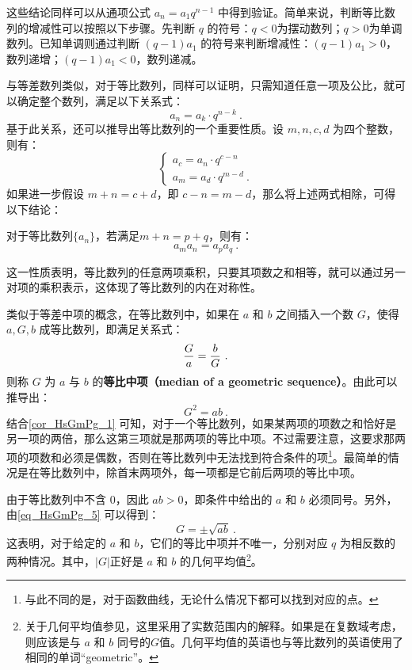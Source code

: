 这些结论同样可以从通项公式 $a_n = a_1 q^{n-1}$ 中得到验证。简单来说，判断等比数列的增减性可以按照以下步骤。先判断 $q$ 的符号：$q<0$为摆动数列；$q>0$为单调数列。已知单调则通过判断 $(q - 1)a_1$ 的符号来判断增减性：$(q - 1)a_1 > 0$，数列递增；$(q - 1)a_1 < 0$，数列递减。

与等差数列类似，对于等比数列，同样可以证明，只需知道任意一项及公比，就可以确定整个数列，满足以下关系式：
\begin{equation}
a_n=a_k\cdot q^{n-k}~.
\end{equation}
基于此关系，还可以推导出等比数列的一个重要性质。设 $m, n, c, d$ 为四个整数，则有：
\begin{equation}
\begin{cases}
a_c=a_n\cdot q^{c-n}\\
a_m=a_d\cdot q^{m-d}~.
\end{cases}
\end{equation}
如果进一步假设 $m+n = c+d$，即 $c-n = m-d$，那么将上述两式相除，可得以下结论：
\begin{corollary}{}\label{cor_HsGmPg_1}
对于等比数列$\{a_n\}$，若满足$m+n=p+q$，则有：
\begin{equation}
a_ma_n=a_pa_q~.
\end{equation}
\end{corollary}
这一性质表明，等比数列的任意两项乘积，只要其项数之和相等，就可以通过另一对项的乘积表示，这体现了等比数列的内在对称性。

类似于等差中项的概念，在等比数列中，如果在 $a$ 和 $b$ 之间插入一个数 $G$，使得 $a, G, b$ 成等比数列，即满足关系式：
\begin{equation}
{G\over a} = {b\over G}~.
\end{equation}
则称 $G$ 为 $a$ 与 $b$ 的\textbf{等比中项（median of a geometric sequence）}。由此可以推导出：
\begin{equation}\label{eq_HsGmPg_5}
G^2 = ab~.
\end{equation}
结合\autoref{cor_HsGmPg_1} 可知，对于一个等比数列，如果某两项的项数之和恰好是另一项的两倍，那么这第三项就是那两项的等比中项。不过需要注意，这要求那两项的项数和必须是偶数，否则在等比数列中无法找到符合条件的项\footnote{与此不同的是，对于函数曲线，无论什么情况下都可以找到对应的点。}。最简单的情况是在等比数列中，除首末两项外，每一项都是它前后两项的等比中项。

由于等比数列中不含 $0$，因此 $ab > 0$，即条件中给出的 $a$ 和 $b$ 必须同号。另外，由\autoref{eq_HsGmPg_5} 可以得到：
\begin{equation}
G = \pm \sqrt{ab}~.
\end{equation}
这表明，对于给定的 $a$ 和 $b$，它们的等比中项并不唯一，分别对应 $q$ 为相反数的两种情况。其中，$|G|$正好是 $a$ 和 $b$ 的几何平均值\footnote{关于几何平均值参见，这里采用了实数范围内的解释。如果是在复数域考虑，则应该是与 $a$ 和 $b$ 同号的$G$值。几何平均值的英语也与等比数列的英语使用了相同的单词“geometric”。}。

